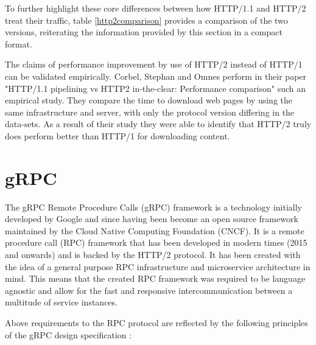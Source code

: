 \documentclass[conference]{IEEEtran}
\begin{document}
To further highlight these core differences between how HTTP/1.1 and HTTP/2 treat their traffic, table \ref{http2comparison} provides a comparison of the two versions, reiterating the information provided by this section in a compact format.

The claims of performance improvement by use of HTTP/2 instead of HTTP/1 can be validated empirically. Corbel, Stephan and Omnes perform in their paper "HTTP/1.1 pipelining vs HTTP2 in-the-clear: Performance comparison" \cite{7745823} such an empirical study. They compare the time to download web pages by using the same infrastructure and server, with only the protocol version differing in the data-sets. As a result of their study they were able to identify that HTTP/2 truly does perform better than HTTP/1 for downloading content.

\section{gRPC}
\label{sec:grpc}

The gRPC Remote Procedure Calls (gRPC) framework \cite{GRPCAuthors2020} is a technology initially developed by Google and since having been become an open source framework maintained by the Cloud Native Computing Foundation (CNCF). It is a remote procedure call (RPC) framework that has been developed in modern times (2015 and onwards) and is backed by the HTTP/2 protocol. It has been created with the idea of a general purpose RPC infrastructure and microservice architecture in mind. This means that the created RPC framework was required to be language agnostic and allow for the fast and responsive intercommunication between a multitude of service instances. 

Above requirements to the RPC protocol are reflected by the following principles of the gRPC design specification \cite{grpcmotiviation}:
\end{document}

